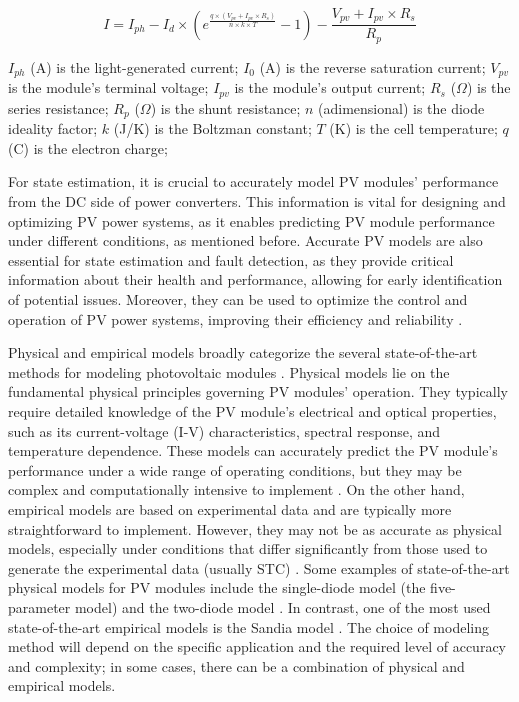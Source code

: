 \begin{equation} \label{eq:iv}
    I = I_{ph} - I_d \times (e^{\frac{q \times (V_{pv} + I_{pv} \times R_{s})}{n \times k \times T}} - 1) - \frac{V_{pv} + I_{pv} \times R_s}{R_p}
\end{equation}

$I_{ph}$ (A) is the light-generated current;
$I_{0}$ (A) is the reverse saturation current;
$V_{pv}$ is the module's terminal voltage;
$I_{pv}$ is the module's output current;
$R_{s}$ ($\Omega$) is the series resistance;
$R_{p}$ ($\Omega$) is the shunt resistance;
$n$ (adimensional) is the diode ideality factor;
$k$ (J/K) is the Boltzman constant;
$T$ (K) is the cell temperature;
$q$ (C) is the electron charge;

For state estimation, it is crucial to accurately model PV modules' performance from the DC side of power converters. This information is vital for designing and optimizing PV power systems, as it enables predicting PV module performance under different conditions, as mentioned before. Accurate PV models are also essential for state estimation and fault detection, as they provide critical information about their health and performance, allowing for early identification of potential issues. Moreover, they can be used to optimize the control and operation of PV power systems, improving their efficiency and reliability \cite{Braun2011}.

Physical and empirical models broadly categorize the several state-of-the-art methods for modeling photovoltaic modules \cite{Braun2011}. Physical models lie on the fundamental physical principles governing PV modules' operation. They typically require detailed knowledge of the PV module's electrical and optical properties, such as its current-voltage (I-V) characteristics, spectral response, and temperature dependence. These models can accurately predict the PV module's performance under a wide range of operating conditions, but they may be complex and computationally intensive to implement \cite{Kumar2019}. On the other hand, empirical models are based on experimental data and are typically more straightforward to implement. However, they may not be as accurate as physical models, especially under conditions that differ significantly from those used to generate the experimental data (usually STC) \cite{Braun2011}. Some examples of state-of-the-art physical models for PV modules include the single-diode model (the five-parameter model) and the two-diode model \cite{Godina2017}. In contrast, one of the most used state-of-the-art empirical models is the Sandia model \cite{Braun2011}. The choice of modeling method will depend on the specific application and the required level of accuracy and complexity; in some cases, there can be a combination of physical and empirical models.

